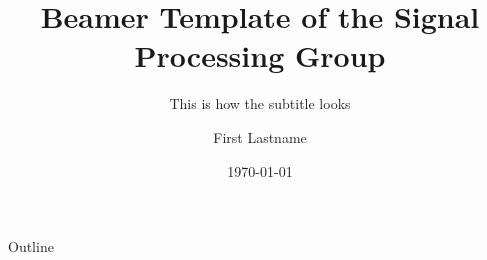 \documentclass[10pt]{beamer}
\title[This is the short title]{Beamer Template of the Signal Processing Group}
\subtitle{This is how the subtitle looks}
\author[F. Lastname]{First Lastname}
\institute[Uni Hamburg]{Universität Hamburg\\ Signal Processing (SP)}
\date{\today}
\begin{document}
\begin{frame}[plain]
    \maketitle
\end{frame}

\begin{frame}{Outline}
    \tableofcontents
\end{frame}


\end{document}
